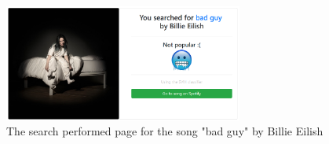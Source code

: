 \begin{figure}[h]
\centering
\includegraphics[width=0.7\textwidth]{web_application/fig/ui5.PNG} %
\caption{The search performed page for the song "bad guy" by Billie Eilish}
\label{fig:ui4}
\end{figure}